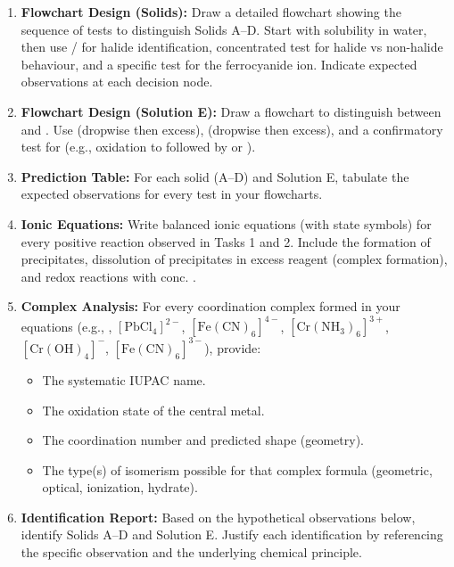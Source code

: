 \documentclass[11pt]{article}
\newcounter{popsec}
\newcounter{popsub}
\newcommand{\courssub}[1]{%
  \stepcounter{popsub}%
  \par\vspace{9pt}\noindent{\popxbold\fontsize{11.5}{13}\selectfont\color{popink}{\color{poporange}\thepopsec.\thepopsub}\hspace{6pt}#1}\par\nopagebreak\vspace{4pt}
}
\begin{document}
\courssub{Tasks}
\begin{enumerate}
    \item \textbf{Flowchart Design (Solids):} Draw a detailed flowchart showing the sequence of tests to distinguish Solids A–D. Start with solubility in water, then use / for halide identification, concentrated  test for halide vs non-halide behaviour, and a specific test for the ferrocyanide ion. Indicate expected observations at each decision node.
    \item \textbf{Flowchart Design (Solution E):} Draw a flowchart to distinguish between  and . Use  (dropwise then excess),  (dropwise then excess), and a confirmatory test for  (e.g., oxidation to  followed by  or ).
    \item \textbf{Prediction Table:} For each solid (A–D) and Solution E, tabulate the expected observations for every test in your flowcharts.
    \item \textbf{Ionic Equations:} Write balanced ionic equations (with state symbols) for every positive reaction observed in Tasks 1 and 2. Include the formation of precipitates, dissolution of precipitates in excess reagent (complex formation), and redox reactions with conc. .
    \item \textbf{Complex Analysis:} For every coordination complex formed in your equations (e.g., \ce{[Ag(NH3)2]+}, \ensuremath{\mathrm{[PbCl_{4}]^{2-}}}, \ensuremath{\mathrm{[Fe(CN)_{6}]^{4-}}}, \ensuremath{\mathrm{[Cr(NH_{3})_{6}]^{3+}}}, \ensuremath{\mathrm{[Cr(OH)_{4}]^{-}}}, \ensuremath{\mathrm{[Fe(CN)_{6}]^{3-}}}), provide:
        \begin{itemize}
            \item The systematic IUPAC name.
            \item The oxidation state of the central metal.
            \item The coordination number and predicted shape (geometry).
            \item The type(s) of isomerism possible for that complex formula (geometric, optical, ionization, hydrate).
        \end{itemize}
    \item \textbf{Identification Report:} Based on the hypothetical observations below, identify Solids A–D and Solution E. Justify each identification by referencing the specific observation and the underlying chemical principle.

\end{enumerate}
\end{document}
